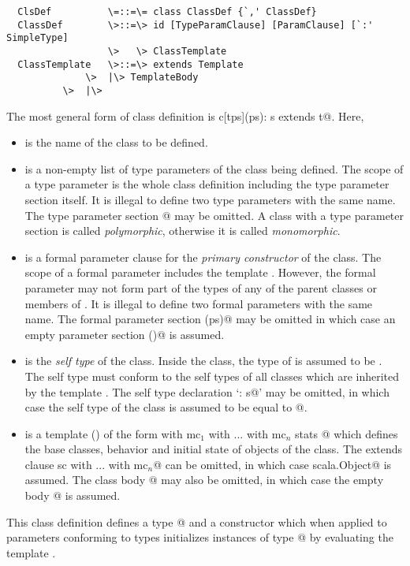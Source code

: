 \documentclass[11pt]{report}
\begin{document}
\syntax\begin{verbatim}
  ClsDef          \=::=\= class ClassDef {`,' ClassDef}
  ClassDef        \>::=\> id [TypeParamClause] [ParamClause] [`:' SimpleType] 
                  \>   \> ClassTemplate
  ClassTemplate   \>::=\> extends Template
	          \>  |\> TemplateBody
		  \>  |\>
\end{verbatim}

The most general form of class definition is 
\verb@class c[tps](ps): s extends t@.
Here,
\begin{itemize}
\item[]
\verb@c@ is the name of the class to be defined.
\item[] \verb@tps@ is a non-empty list of type parameters of the class
being defined.  The scope of a type parameter is the whole class
definition including the type parameter section itself.  It is
illegal to define two type parameters with the same name.  The type
parameter section \verb@[tps]@ may be omitted. A class with a type
parameter section is called {\em polymorphic}, otherwise it is called
{\em monomorphic}.
\item[] 
\verb@ps@ is a formal parameter clause for the {\em primary
constructor} of the class. The scope of a formal parameter includes
the template \verb@t@. However, the formal parameter may not form 
part of the types of any of the parent classes or members of \verb@t@.
It is illegal to define two formal parameters with the same name.
The formal parameter section \verb@(ps)@ may be omitted in which case
an empty parameter section \verb@()@ is assumed.
\item[] 
\verb@s@ is the {\em self type} of the class. Inside the
class, the type of \verb@this@ is assumed to be \verb@s@.  The self
type must conform to the self types of all classes which are inherited
by the template \verb@t@. The self type declaration `\verb@: s@' may be
omitted, in which case the self type of the class is assumed to be
equal to \verb@c[tps]@.
\item[] 
\verb@t@ is a
template () of the form
\verb@sc with mc$_1$ with ... with mc$_n$ { stats }@
which defines the base classes, behavior and initial state of objects of
the class. The extends clause \verb@extends sc with ... with mc$_n$@
can be omitted, in which case
\verb@extends scala.Object@ is assumed.  The class body
@ may also be omitted, in which case the empty body
\verb@{}@ is assumed.
\end{itemize}
This class definition defines a type \verb@c[tps]@ and a constructor
which when applied to parameters conforming to types \verb@ps@
initializes instances of type \verb@c[tps]@ by evaluating the template
\verb@t@.
\end{document}
